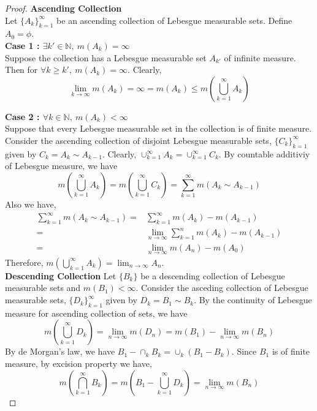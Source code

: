 \begin{proof}
	\textbf{Ascending Collection}\\
	Let $\{ A_k \}_{k=1}^\infty$ be an ascending collection of Lebesgue measurable sets. Define $A_0 = \phi$.\\

	\textbf{Case 1 : $\exists k' \in \mathbb{N},\ m(A_k) = \infty$}\\
	Suppose the collection has a Lebesgue measurable set $A_{k'}$ of infinite measure.
	Then for $\forall k \ge k',\ m(A_k) = \infty$.
	Clearly,
	\begin{equation*}
		\lim_{k \to \infty} m(A_k) = \infty = m(A_k) \le m \left( \bigcup_{k=1}^\infty A_k \right)
	\end{equation*}

	\textbf{Case 2 : $\forall k \in \mathbb{N},\ m(A_k) < \infty$}\\
	Suppose that every Lebesgue measurable set in the collection is of finite measure.
	Consider the ascending collection of disjoint Lebesgue measurable sets, $\{ C_k \}_{k=1}^\infty$ given by $C_k = A_k \sim A_{k-1}$.
	Clearly, $\cup_{k=1}^\infty A_k = \cup_{k=1}^\infty C_k$.
	By countable additiviy of Lebesgue measure, we have 
	\begin{equation*}
		m\left( \bigcup_{k=1}^\infty A_k \right) = m \left( \bigcup_{k=1}^\infty C_k \right) = \sum_{k=1}^\infty m(A_k \sim A_{k-1} )
	\end{equation*}
	Also we have,
	\begin{align*}
		\sum_{k=1}^\infty m(A_k \sim A_{k-1}) = & \sum_{k=1}^\infty m(A_k) - m(A_{k-1})  \\
		= & \lim_{n \to \infty} \sum_{k=1}^n m(A_k) - m(A_{k-1}) \\
		= & \lim_{n \to \infty} m(A_n) - m(A_0)
	\end{align*}
	Therefore, $\displaystyle m\left(\bigcup_{k=1}^\infty A_k \right) = \lim_{n \to \infty} A_n$.\\

	\textbf{Descending Collection}
	Let $\{ B_k \}$ be a descending collection of Lebesgue measurable sets and $m(B_1) < \infty$.
	Consider the asceding collection of Lebesgue measurable sets, $\{ D_k \}_{k=1}^\infty$ given by $D_k = B_1 \sim B_k$.
	By the continuity of Lebesgue measure for ascending collection of sets, we have
	\begin{equation*}
		m\left( \bigcup_{k=1}^\infty D_k \right) = \lim_{n \to \infty} m(D_n) = m(B_1) - \lim_{n \to \infty} m(B_n)
	\end{equation*}
	By de Morgan's law, we have $ B_1 - \cap_k B_k = \cup_k (B_1-B_k)$.
	Since $B_1$ is of finite measure, by excision property we have,
	$$ m \left( \bigcap_{k=1}^\infty B_k \right) = m \left(B_1 - \bigcup_{k=1}^\infty D_k \right) = \lim_{n \to \infty} m(B_n) $$
\end{proof}
